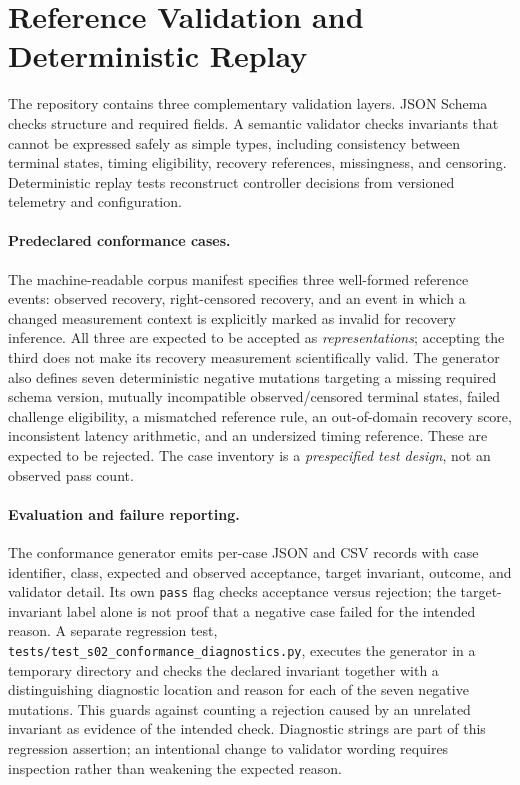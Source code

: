 \section{Reference Validation and Deterministic Replay}

The repository contains three complementary validation layers. JSON Schema checks structure and required fields. A semantic validator checks invariants that cannot be expressed safely as simple types, including consistency between terminal states, timing eligibility, recovery references, missingness, and censoring. Deterministic replay tests reconstruct controller decisions from versioned telemetry and configuration.

\paragraph{Predeclared conformance cases.}
The machine-readable corpus manifest specifies three well-formed reference events: observed recovery, right-censored recovery, and an event in which a changed measurement context is explicitly marked as invalid for recovery inference. All three are expected to be accepted as \emph{representations}; accepting the third does not make its recovery measurement scientifically valid. The generator also defines seven deterministic negative mutations targeting a missing required schema version, mutually incompatible observed/censored terminal states, failed challenge eligibility, a mismatched reference rule, an out-of-domain recovery score, inconsistent latency arithmetic, and an undersized timing reference. These are expected to be rejected. The case inventory is a \emph{prespecified test design}, not an observed pass count.

\paragraph{Evaluation and failure reporting.}
The conformance generator emits per-case JSON and CSV records with case identifier, class, expected and observed acceptance, target invariant, outcome, and validator detail. Its own \texttt{pass} flag checks acceptance versus rejection; the target-invariant label alone is not proof that a negative case failed for the intended reason. A separate regression test, \nolinkurl{tests/test_s02_conformance_diagnostics.py}, executes the generator in a temporary directory and checks the declared invariant together with a distinguishing diagnostic location and reason for each of the seven negative mutations. This guards against counting a rejection caused by an unrelated invariant as evidence of the intended check. Diagnostic strings are part of this regression assertion; an intentional change to validator wording requires inspection rather than weakening the expected reason.

